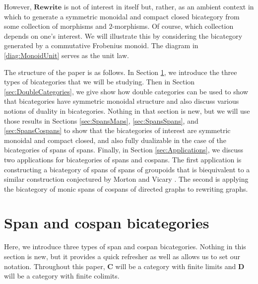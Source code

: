 \documentclass[11pt]{amsart}
\newcommand{\cat}[1]{\mathbf{#1}}
\theoremstyle{remark}
\theoremstyle{definition}
\begin{document}
However, $\cat{Rewrite}$ is not of interest in itself but, rather, as an ambient context in which to generate a symmetric monoidal and compact closed bicategory from some collection of morphisms and $2$-morphisms. Of course, which collection depends on one's interest.  We will illustrate this by considering the bicategory generated by a commutative Frobenius monoid. The diagram in \eqref{diag:MonoidUnit} serves as the unit law.  
 
The structure of the paper is as follows.  In Section \ref{sec:Span cospan bicats}, we introduce the three types of bicategories that we will be studying.  Then in Section \ref{sec:DoubleCategories}, we give show how double categories can be used to show that bicategories have symmetric monoidal structure and also discuss various notions of duality in bicategories.  Nothing in that section is new, but we will use those results in Sections \ref{sec:SpansMaps}, \ref{sec:SpansSpans}, and \ref{sec:SpansCospans} to show that the bicategories of interest are symmetric monoidal and compact closed, and also fully dualizable in the case of the bicategories of spans of spans.  Finally, in Section \ref{sec:Applications}, we discuss two applications for bicategories of spans and cospans.  The first application is constructing a bicategory of spans of spans of groupoids that is biequivalent to a similar construction conjectured by Morton and Vicary \cite{MortVic}.  The second is applying the bicategory of monic spans of cospans of directed graphs to rewriting graphs.


\section{Span and cospan bicategories} %
\label{sec:Span cospan bicats}

Here, we introduce three types of span and cospan bicategories.  Nothing in this section is new, but it provides a quick refresher as well as allows us to set our notation.  Throughout this paper, $\cat{C}$ will be a category with finite limits and $\cat{D}$ will be a category with finite colimits.  
\end{document}
